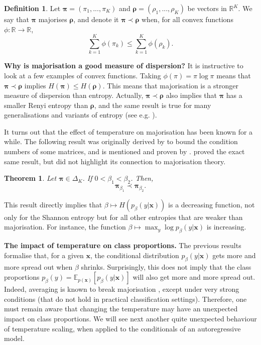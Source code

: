 \documentclass[10pt,dvipsnames]{article}
\newcommand{\bx}{\mathbf{x}}%
\newcommand{\bpi}{\boldsymbol{\pi}}%
\theoremstyle{plain}
\newtheorem{theorem}{Theorem}[section]
\theoremstyle{definition}
\newtheorem{definition}{Definition}
\theoremstyle{remark}
\begin{document}
\begin{definition}
	Let $\bpi = (\pi_1,...,\pi_K)$ and $\boldsymbol{\rho} = (\rho_1,...,\rho_K)$ be vectors in $\mathbb{R}^K$. We say that $\bpi$ majorises $\boldsymbol{\rho}$, and denote it $\bpi \prec \boldsymbol{\rho}$ when, for all  convex functions $\phi: \mathbb{R}  \rightarrow \mathbb{R}$,
	\begin{equation}
		\sum_{k=1}^K \phi(\pi_k ) \leq \sum_{k=1}^K \phi(\rho_k ).
	\end{equation}
\end{definition}

\textbf{Why is majorisation a good measure of dispersion?} It is instructive to look at a few examples of convex functions. Taking $\phi(\pi) = \pi \log \pi$ means that  $\bpi \prec \boldsymbol{\rho}$ implies $H(\bpi) \leq H(\boldsymbol{\rho})$. This means that majorisation is a stronger measure of dispersion than entropy. Actually, $\bpi \prec \boldsymbol{\rho}$  also implies that $\bpi $ has a smaller Renyi entropy than $\boldsymbol{\rho}$, and the same result is true for many generalisations and variants of entropy (see e.g. \citealp{kvaalseth2022entropies}).

It turns out that the effect of temperature on majorisation has been known for a while. The following result was originally derived by \citet{marshall1965norms} to bound the condition numbers of some matrices, and is mentioned and proven by \citet[p. 189]{marshall2011inequalities}. \citet[Theorem 4.1]{dabah2025temperature} proved the exact same result, but did not highlight its connection to majorisation theory.

\begin{theorem} \label{th:majorisation} Let $\bpi \in \Delta_K$. If $0<\beta_1<\beta_2$. Then,
	\begin{equation}
		\bpi_{\beta_1}\prec \bpi_{\beta_2}.
	\end{equation}
\end{theorem}
This result directly implies that $\beta \mapsto H(p_\beta (y | \bx))$ is a decreasing function, not only for the Shannon entropy but for all other entropies that are weaker than majorisation. For instance, the function $\beta \mapsto \max_y \log p_\beta (y |\bx)$ is increasing.


\textbf{The impact of temperature on class proportions.} The previous results formalise that, for a given $\bx$, the conditional distribution $p_\beta (y | \bx)$ gets more and more spread out when $\beta$ shrinks. Surprisingly, this does not imply that the class proportions $p_\beta (y) = \mathbb{E}_{p(\bx)} [p_\beta(y | \bx)]$ will also get more and more spread out. Indeed, averaging is known to break majorisation \citep[Chapter 6]{marshall2011inequalities}, except under very strong conditions (that do not hold in practical classification settings). Therefore, one must remain aware that changing the temperature may have an unexpected impact on class proportions. We will see next another quite unexpected behaviour of temperature scaling, when applied to the conditionals of an autoregressive model.
\end{document}
